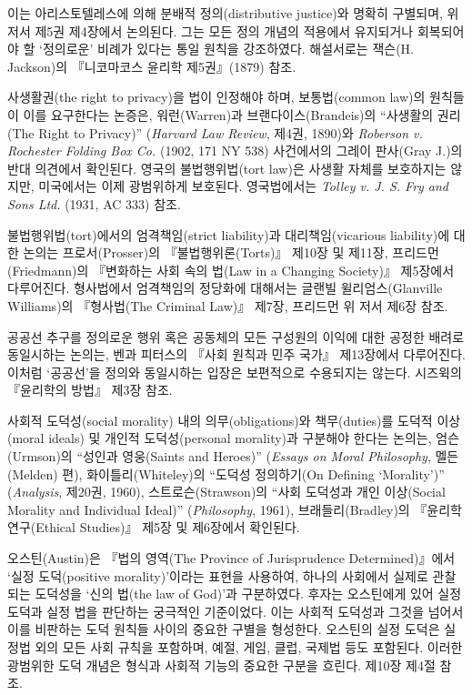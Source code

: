 { 이는 아리스토텔레스에 의해
분배적 정의(distributive justice)와 명확히 구별되며, 위 저서 제5권
제4장에서 논의된다. 그는 모든 정의 개념의 적용에서 유지되거나 회복되어야
할 `정의로운' 비례가 있다는 통일 원칙을 강조하였다. 해설서로는 잭슨(H.
Jackson)의 『니코마코스 윤리학 제5권』(1879) 참조.

 사생활권(the right to
privacy)을 법이 인정해야 하며, 보통법(common law)의 원칙들이 이를
요구한다는 논증은, 워런(Warren)과 브랜다이스(Brandeis)의 ``사생활의
권리(The Right to Privacy)'' (\emph{Harvard Law Review}, 제4권, 1890)와
\emph{Roberson v. Rochester Folding Box Co.} (1902, 171 NY 538)
사건에서의 그레이 판사(Gray J.)의 반대 의견에서 확인된다. 영국의
불법행위법(tort law)은 사생활 자체를 보호하지는 않지만, 미국에서는 이제
광범위하게 보호된다. 영국법에서는 \emph{Tolley v. J. S. Fry and Sons
Ltd.} (1931, AC 333) 참조.

불법행위법(tort)에서의 엄격책임(strict liability)과 대리책임(vicarious
liability)에 대한 논의는 프로서(Prosser)의 『불법행위론(Torts)』 제10장
및 제11장, 프리드먼(Friedmann)의 『변화하는 사회 속의 법(Law in a
Changing Society)』 제5장에서 다루어진다. 형사법에서 엄격책임의 정당화에
대해서는 글랜빌 윌리엄스(Glanville Williams)의 『형사법(The Criminal
Law)』 제7장, 프리드먼 위 저서 제6장 참조.

 공공선 추구를 정의로운 행위
혹은 공동체의 모든 구성원의 이익에 대한 공정한 배려로 동일시하는 논의는,
벤과 피터스의 『사회 원칙과 민주 국가』 제13장에서 다루어진다. 이처럼
`공공선'을 정의와 동일시하는 입장은 보편적으로 수용되지는 않는다.
시즈윅의 『윤리학의 방법』 제3장 참조.

 사회적 도덕성(social
morality) 내의 의무(obligations)와 책무(duties)를 도덕적 이상(moral
ideals) 및 개인적 도덕성(personal morality)과 구분해야 한다는 논의는,
엄슨(Urmson)의 ``성인과 영웅(Saints and Heroes)'' (\emph{Essays on Moral
Philosophy}, 멜든(Melden) 편), 화이틀리(Whiteley)의 ``도덕성 정의하기(On
Defining `Morality')'' (\emph{Analysis}, 제20권, 1960),
스트로슨(Strawson)의 ``사회 도덕성과 개인 이상(Social Morality and
Individual Ideal)'' (\emph{Philosophy}, 1961), 브래들리(Bradley)의
『윤리학 연구(Ethical Studies)』 제5장 및 제6장에서 확인된다.

 오스틴(Austin)은 『법의 영역(The
Province of Jurisprudence Determined)』에서 `실정 도덕(positive
morality)'이라는 표현을 사용하여, 하나의 사회에서 실제로 관찰되는
도덕성을 `신의 법(the law of God)'과 구분하였다. 후자는 오스틴에게 있어
실정 도덕과 실정 법을 판단하는 궁극적인 기준이었다. 이는 사회적 도덕성과
그것을 넘어서 이를 비판하는 도덕 원칙들 사이의 중요한 구별을 형성한다.
오스틴의 실정 도덕은 실정법 외의 모든 사회 규칙을 포함하며, 예절, 게임,
클럽, 국제법 등도 포함된다. 이러한 광범위한 도덕 개념은 형식과 사회적
기능의 중요한 구분을 흐린다. 제10장 제4절 참조.

}
